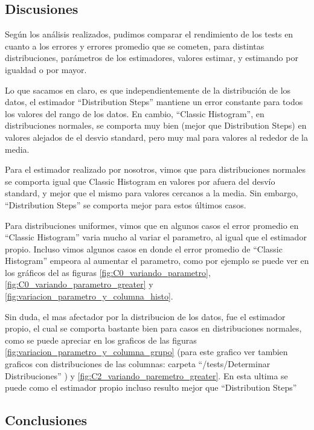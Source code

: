 	\subsection{Discusiones}	
	
	Seg\'un los an\'alisis realizados, pudimos comparar el rendimiento de los tests en cuanto a los errores y errores promedio que se cometen, para distintas distribuciones, par\'ametros de los estimadores, valores estimar, y estimando por igualdad o por mayor.
	
	Lo que sacamos en claro, es que independientemente de la distribuci\'on de los datos, el estimador ``Distribution Steps'' mantiene un error constante para todos los valores del rango de los datos. En cambio, ``Classic Histogram'', en distribuciones normales, se comporta muy bien (mejor que Distribution Steps) en valores alejados de el desvio standard, pero muy mal para valores al rededor de la media.
	
	Para el estimador realizado por nosotros, vimos que para distribuciones normales se comporta igual que Classic Histogram en valores por afuera del desv\'io standard, y mejor que el mismo para valores cercanos a la media. Sin embargo, ``Distribution Steps'' se comporta mejor para estos \'ultimos casos.
	
	Para distribuciones uniformes, vimos que en algunos casos el error promedio en ``Classic Histogram'' varia mucho al variar el parametro, al igual que el estimador propio. Incluso vimos algunos casos en donde el error promedio de ``Classic Histogram'' empeora al aumentar el parametro, como por ejemplo se puede ver en los gr\'aficos del as figuras \ref{fig:C0_variando_parametro}, \ref{fig:C0_variando_parametro_greater} y \ref{fig:variacion_parametro_y_columna_histo}.
	
	Sin duda, el mas afectador por la distribucion de los datos, fue el estimador propio, el cual se comporta bastante bien para casos en distribuciones normales, como se puede apreciar en los graficos de las figuras \ref{fig:variacion_parametro_y_columna_grupo} (para este grafico ver tambien graficos con distribuciones de las columnas: carpeta ``/tests/Determinar Distribuciones'' ) y \ref{fig:C2_variando_paremetro_greater}. En esta ultima se puede como el estimador propio incluso resulto mejor que ``Distribution Steps''
	
	\subsection{Conclusiones}
	
